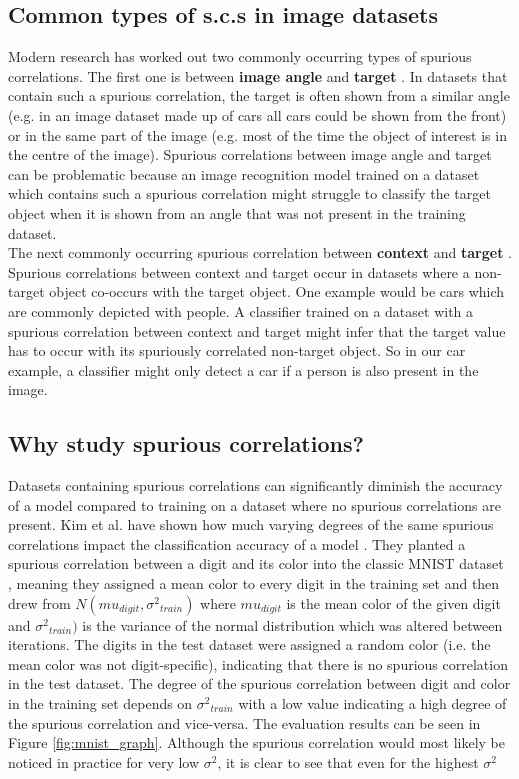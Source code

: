 \documentclass{article}
\begin{document}
\subsection{Common types of s.c.s in image datasets}
Modern research has worked out two commonly occurring types of spurious correlations. The first one is  between \textbf{image angle} and \textbf{target} \cite{5995347}. In datasets that contain such a spurious correlation, the target is often shown from a similar angle (e.g. in an image dataset made up of cars all cars could be shown from the front) or in the same part of the image (e.g. most of the time the object of interest is in the centre of the image). Spurious correlations between image angle and target can be problematic because an image recognition model trained on a dataset which contains such a spurious correlation might struggle to classify the target object when it is shown from an angle that was not present in the training dataset. \\
The next commonly occurring spurious correlation between \textbf{context} and \textbf{target} \cite{Singh_2020_CVPR}. Spurious correlations between context and target occur in datasets where a non-target object co-occurs with the target object. One example would be cars which are commonly depicted with people. A classifier trained on a dataset with a spurious correlation between context and target might infer that the target value has to occur with its spuriously correlated non-target object. So in our car example, a classifier might only detect a car if a person is also present in the image.

\subsection{Why study spurious correlations?}
Datasets containing spurious correlations can significantly diminish the accuracy of a model compared to training on a dataset where no spurious correlations are present. Kim et al. have shown how much varying degrees of the same spurious correlations impact the classification accuracy of a model \cite{Kim_2019_CVPR}. They planted a spurious correlation between a digit and its color into the classic MNIST dataset \cite{mnist}, meaning they assigned a mean color to every digit in the training set and then drew from $N(mu_{digit},{\sigma^2}_{train})$ where $mu_{digit}$ is the mean color of the given digit and ${\sigma^2}_{train})$ is the variance of the normal distribution which was altered between iterations. The digits in the test dataset were assigned a random color (i.e. the mean color was not digit-specific), indicating that there is no spurious correlation in the test dataset. The degree of the spurious correlation between digit and color in the training set depends on ${\sigma^2}_{train}$ with a low value indicating a high degree of the spurious correlation and vice-versa. The evaluation results can be seen in Figure \ref{fig:mnist_graph}. Although the spurious correlation would most likely be noticed in practice for very low $\sigma^2$, it is clear to see that even for the highest $\sigma^2$
\end{document}
